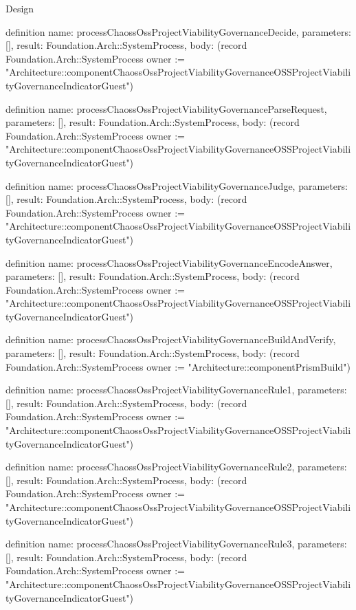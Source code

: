 \begin{lexlean}{Design}
\begin{semanticmodule}
definition{
  name: processChaossOssProjectViabilityGovernanceDecide,
  parameters: [],
  result: Foundation.Arch::SystemProcess,
  body: (record Foundation.Arch::SystemProcess {owner := "Architecture::componentChaossOssProjectViabilityGovernanceOSSProjectViabilityGovernanceIndicatorGuest"})
}

definition{
  name: processChaossOssProjectViabilityGovernanceParseRequest,
  parameters: [],
  result: Foundation.Arch::SystemProcess,
  body: (record Foundation.Arch::SystemProcess {owner := "Architecture::componentChaossOssProjectViabilityGovernanceOSSProjectViabilityGovernanceIndicatorGuest"})
}

definition{
  name: processChaossOssProjectViabilityGovernanceJudge,
  parameters: [],
  result: Foundation.Arch::SystemProcess,
  body: (record Foundation.Arch::SystemProcess {owner := "Architecture::componentChaossOssProjectViabilityGovernanceOSSProjectViabilityGovernanceIndicatorGuest"})
}

definition{
  name: processChaossOssProjectViabilityGovernanceEncodeAnswer,
  parameters: [],
  result: Foundation.Arch::SystemProcess,
  body: (record Foundation.Arch::SystemProcess {owner := "Architecture::componentChaossOssProjectViabilityGovernanceOSSProjectViabilityGovernanceIndicatorGuest"})
}

definition{
  name: processChaossOssProjectViabilityGovernanceBuildAndVerify,
  parameters: [],
  result: Foundation.Arch::SystemProcess,
  body: (record Foundation.Arch::SystemProcess {owner := "Architecture::componentPrismBuild"})
}

definition{
  name: processChaossOssProjectViabilityGovernanceRule1,
  parameters: [],
  result: Foundation.Arch::SystemProcess,
  body: (record Foundation.Arch::SystemProcess {owner := "Architecture::componentChaossOssProjectViabilityGovernanceOSSProjectViabilityGovernanceIndicatorGuest"})
}

definition{
  name: processChaossOssProjectViabilityGovernanceRule2,
  parameters: [],
  result: Foundation.Arch::SystemProcess,
  body: (record Foundation.Arch::SystemProcess {owner := "Architecture::componentChaossOssProjectViabilityGovernanceOSSProjectViabilityGovernanceIndicatorGuest"})
}

definition{
  name: processChaossOssProjectViabilityGovernanceRule3,
  parameters: [],
  result: Foundation.Arch::SystemProcess,
  body: (record Foundation.Arch::SystemProcess {owner := "Architecture::componentChaossOssProjectViabilityGovernanceOSSProjectViabilityGovernanceIndicatorGuest"})
}


\end{semanticmodule}
\end{lexlean}
